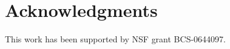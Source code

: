 \documentclass[11pt]{article}
\begin{document}



\section{Acknowledgments}

This work has been supported by NSF grant BCS-0644097.  




\end{document}
